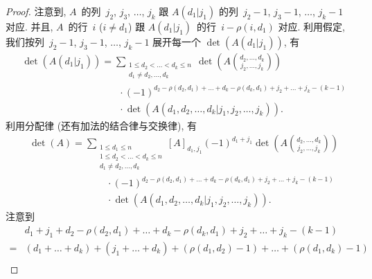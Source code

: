 \documentclass[%
    UTF8,%
    fontset=none,%
    punct=kaiming,%
    zihao=-4,%
    a4paper,%
    oneside,%
]{ctexbook}
\renewcommand*{\leq}{\leqslant}
\begin{document}
\begin{proof}
    注意到,
    \(A\)~的列~\(j_2\), \(j_3\), \(\dots\), \(j_k\)
    跟 \(A(d_1|j_1)\) 的列~\(j_2 - 1\),
    \(j_3 - 1\), \(\dots\), \(j_k - 1\)
    对应.
    并且, \(A\)~的行~\(i\) (\(i \neq d_1\))
    跟 \(A(d_1|j_1)\)~的行~\(i - \rho(i, d_1)\) 对应.
    利用假定,
    我们按列~\(j_2 - 1\), \(j_3 - 1\), \(\dots\), \(j_k - 1\)
    展开每一个 \(\det {(A(d_1|j_1))}\),
    有
    \begin{align*}
         &
        \det {(A(d_1|j_1))}
        = \sum_{\substack{
        1 \leq d_2 < \dots < d_k \leq n \\
                d_1 \neq d_2,\dots,d_k
            }}
        {\det {\left(
                A\binom{d_2, \dots, d_k}{j_2, \dots, j_k}
                \right)}}
        \\
         &
        \qquad \qquad \qquad \qquad \qquad
        \cdot (-1)^{d_2 - \rho(d_2, d_1) + \dots
            + d_k - \rho(d_k, d_1)
            + j_2 + \dots + j_k - (k - 1)}
        \\
         &
        \qquad \qquad \qquad \qquad \qquad
        \cdot \det
        {(A({d_1,d_2,\dots,d_k}|{j_1,j_2,\dots,j_k}))}.
    \end{align*}
    利用分配律 (还有加法的结合律与交换律), 有
    \begin{align*}
         &
        \det {(A)}
        = \sum_{\substack{
        1 \leq d_1 \leq n               \\
        1 \leq d_2 < \dots < d_k \leq n \\
                d_1 \neq d_2,\dots,d_k
            }}
        {[A]_{d_1,j_1}
            (-1)^{d_1 + j_1}
            \det {\left(
                A\binom{d_2, \dots, d_k}{j_2, \dots, j_k}
                \right)}}
        \\
         &
        \qquad \qquad \qquad \qquad
        \cdot (-1)^{d_2 - \rho(d_2, d_1) + \dots
            + d_k - \rho(d_k, d_1)
            + j_2 + \dots + j_k - (k - 1)}
        \\
         &
        \qquad \qquad \qquad \qquad
        \cdot \det {(A({d_1,d_2,\dots,d_k}|{j_1,j_2,\dots,j_k}))}.
    \end{align*}
    注意到
    \begin{align*}
             &
        d_1 + j_1 + d_2 - \rho(d_2, d_1) + \dots
        + d_k - \rho(d_k, d_1)
        + j_2 + \dots + j_k - (k - 1)
        \\
        = {} &
        (d_1 + \dots + d_k) + (j_1 + \dots + d_k)
        + (\rho(d_1, d_2) - 1) + \dots + (\rho(d_1, d_k) - 1)
        \\

\end{align*}
\end{proof}
\end{document}
